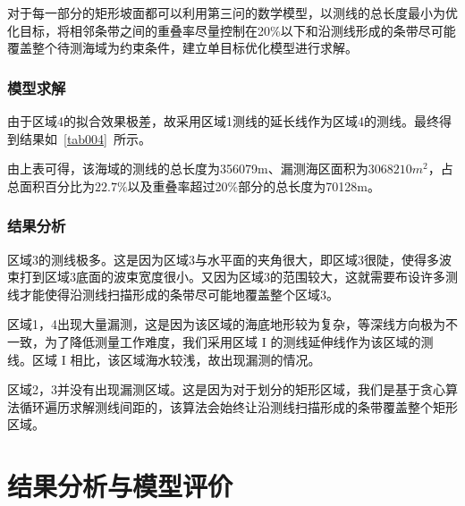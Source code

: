\documentclass{cumcmthesis}
\begin{document}
对于每一部分的矩形坡面都可以利用第三问的数学模型，以测线的总长度最小为优化目标，将相邻条带之间的重叠率尽量控制在20\%以下和沿测线形成的条带尽可能覆盖整个待测海域为约束条件，建立单目标优化模型进行求解。

\subsubsection{模型求解}

由于区域4的拟合效果极差，故采用区域1测线的延长线作为区域4的测线。最终得到结果如~\ref{tab004}~所示。
\begin{table}[!htbp]
	\centering
	\caption{第四问模型求解结果示意}\label{tab004}
\end{table}

由上表可得，该海域的测线的总长度为356079m、漏测海区面积为$3068210m^2$，占总面积百分比为$22.7\%$以及重叠率超过20\%部分的总长度为70128m。

\subsubsection{结果分析}
区域3的测线极多。这是因为区域3与水平面的夹角很大，即区域3很陡，使得多波束打到区域3底面的波束宽度很小。又因为区域3的范围较大，这就需要布设许多测线才能使得沿测线扫描形成的条带尽可能地覆盖整个区域3。

区域1，4出现大量漏测，这是因为该区域的海底地形较为复杂，等深线方向极为不一致，为了降低测量工作难度，我们采用区域 I 的测线延伸线作为该区域的测线。区域 I 相比，该区域海水较浅，故出现漏测的情况。

区域2，3并没有出现漏测区域。这是因为对于划分的矩形区域，我们是基于贪心算法循环遍历求解测线间距的，该算法会始终让沿测线扫描形成的条带覆盖整个矩形区域。


\section{结果分析与模型评价}
\end{document}
